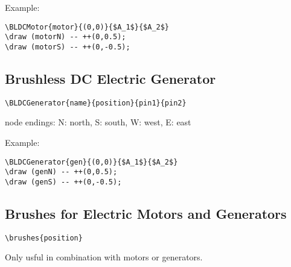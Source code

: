 \documentclass[parskip=full]{scrartcl}
\begin{document}
Example:\\
\begin{minipage}{0.8\textwidth}
\begin{verbatim}
\BLDCMotor{motor}{(0,0)}{$A_1$}{$A_2$}
\draw (motorN) -- ++(0,0.5);
\draw (motorS) -- ++(0,-0.5);
\end{verbatim}
\end{minipage}
\begin{minipage}{0.19\textwidth}
\end{minipage}

\subsection{Brushless DC Electric Generator}

\begin{verbatim}
\BLDCGenerator{name}{position}{pin1}{pin2}
\end{verbatim}
node endings: N: north, S: south, W: west, E: east

Example:\\
\begin{minipage}{0.8\textwidth}
\begin{verbatim}
\BLDCGenerator{gen}{(0,0)}{$A_1$}{$A_2$}
\draw (genN) -- ++(0,0.5);
\draw (genS) -- ++(0,-0.5);
\end{verbatim}
\end{minipage}
\begin{minipage}{0.19\textwidth}
\end{minipage}

\subsection{Brushes for Electric Motors and Generators}

\begin{verbatim}
\brushes{position}
\end{verbatim}
Only usful in combination with motors or generators.
\end{document}
